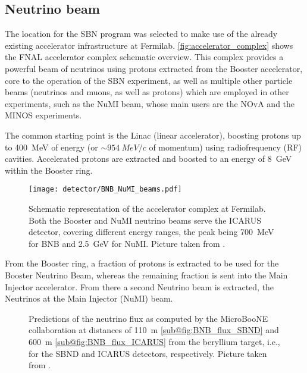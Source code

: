 \subsection{Neutrino beam}

The location for the SBN program was selected to make use of the already existing accelerator infrastructure at Fermilab. \autoref{fig:accelerator_complex} shows the FNAL accelerator complex schematic overview. This complex provides a powerful beam of neutrinos using protons extracted from the Booster accelerator, core to the operation of the SBN experiment, as well as multiple other particle beams (neutrinos and muons, as well as protons) which are employed in other experiments, such as the NuMI beam, whose main users are the NOvA and the MINOS experiments. 

The common starting point is the Linac (linear accelerator), boosting protons up to \SI{400}{MeV} of energy (or ${\sim}\SI{954}{MeV/c}$ of momentum) using radiofrequency (RF) cavities. Accelerated protons are extracted and boosted to an energy of \SI{8}{GeV} within the Booster ring. 

\begin{figure}
    \centering
    \texttt{[image: detector/BNB\_NuMI\_beams.pdf]}
    \caption[Fermilab Accelerator complex]{Schematic representation of the accelerator complex at Fermilab. Both the Booster and NuMI neutrino beams serve the ICARUS detector, covering different energy  ranges, the peak being \SI{700}{MeV} for BNB and \SI{2.5}{GeV} for NuMI. Picture taken from \cite{ainsworthHighIntensityOperation2020}.}
    \label{fig:accelerator_complex}
\end{figure}

From the Booster ring, a fraction of protons is extracted to be used for the Booster Neutrino Beam, whereas the remaining fraction is sent into the Main Injector accelerator. From there a second Neutrino beam is extracted, the Neutrinos at the Main Injector (NuMI) beam. 

\begin{figure}
    \centering

    \caption[BNB flux predictions at the near and far detectors]{Predictions of the neutrino flux as computed by the MicroBooNE collaboration \cite{miniboonecollaborationNeutrinoFluxPrediction2009} at distances of \SI{110}{m} \ref{sub@fig:BNB_flux_SBND} and \SI{600}{m} \ref{sub@fig:BNB_flux_ICARUS} from the beryllium target, i.e., for the SBND and ICARUS detectors, respectively. Picture taken from \cite{acciarriProposalThreeDetector2015}. }
    \label{fig:BNB_flux}
\end{figure}

